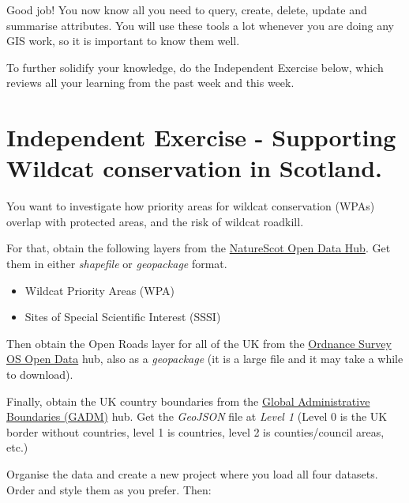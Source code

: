 \documentclass[
  letterpaper,
  DIV=11,
  numbers=noendperiod]{scrreprt}
\providecommand{\tightlist}{%
  \setlength{\itemsep}{0pt}\setlength{\parskip}{0pt}}\usepackage{longtable,booktabs,array}
\begin{document}
Good job! You now know all you need to query, create, delete, update and
summarise attributes. You will use these tools a lot whenever you are
doing any GIS work, so it is important to know them well.

To further solidify your knowledge, do the Independent Exercise below,
which reviews all your learning from the past week and this week.

\section{Independent Exercise - Supporting Wildcat conservation in
Scotland.}\label{independent-exercise---supporting-wildcat-conservation-in-scotland.}

You want to investigate how priority areas for wildcat conservation
(WPAs) overlap with protected areas, and the risk of wildcat roadkill.

For that, obtain the following layers from the
\href{https://opendata.nature.scot/}{NatureScot Open Data Hub}. Get them
in either \emph{shapefile} or \emph{geopackage} format.

\begin{itemize}
\tightlist
\item
  Wildcat Priority Areas (WPA)
\item
  Sites of Special Scientific Interest (SSSI)
\end{itemize}

Then obtain the Open Roads layer for all of the UK from the
\href{https://osdatahub.os.uk/downloads/open}{Ordnance Survey OS Open
Data} hub, also as a \emph{geopackage} (it is a large file and it may
take a while to download).

Finally, obtain the UK country boundaries from the
\href{https://gadm.org/data.html}{Global Administrative Boundaries
(GADM)} hub. Get the \emph{GeoJSON} file at \emph{Level 1} (Level 0 is
the UK border without countries, level 1 is countries, level 2 is
counties/council areas, etc.)

Organise the data and create a new project where you load all four
datasets. Order and style them as you prefer. Then:
\end{document}
